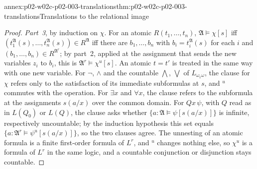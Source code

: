 \begin{annexitem}{annex:p02-w02c-p02-003-translations}{thm:p02-w02c-p02-003-translations}{Translations to the relational image}
\begin{proof}
\emph{Part~3}, by induction on \(\chi\).  For an atomic
\(R(t_1,\ldots,t_n)\), \(\mathfrak A\models\chi[s]\) iff
\((t_1^{\mathfrak A}(s),\ldots,t_n^{\mathfrak A}(s))\in R^{\mathfrak A}\) iff
there are \(b_1,\ldots,b_n\) with \(b_i=t_i^{\mathfrak A}(s)\) for each
\(i\) and \((b_1,\ldots,b_n)\in R^{\mathfrak A^{r}}\); by part~2, applied at
the assignment that sends the new variables \(z_i\) to \(b_i\), this is
\(\mathfrak A^{r}\models\chi^{u}[s]\).  An atomic \(t=t'\) is treated in
the same way with one new variable.  For \(\neg\), \(\land\) and the
countable \(\bigwedge\), \(\bigvee\) of \(L_{\omega_1\omega}\), the clause
for \(\chi\) refers only to the satisfaction of its immediate subformulas
at \(s\), and \({}^{u}\) commutes with the operation.  For \(\exists x\)
and \(\forall x\), the clause refers to the subformula at the assignments
\(s(a/x)\) over the common domain.  For \(Qx\,\psi\), with \(Q\) read as
in \(L(Q_0)\) or \(L(Q)\), the clause asks whether
\(\{a:\mathfrak A\models\psi[s(a/x)]\}\) is infinite, respectively
uncountable; by the induction hypothesis this set equals
\(\{a:\mathfrak A^{r}\models\psi^{u}[s(a/x)]\}\), so the two clauses
agree.  The unnesting of an atomic formula is a finite first-order formula
of \(L^{r}\), and \({}^{u}\) changes nothing else, so \(\chi^{u}\) is a
formula of \(L^{r}\) in the same logic, and a countable conjunction or
disjunction stays countable.
\end{proof}
\end{annexitem}

